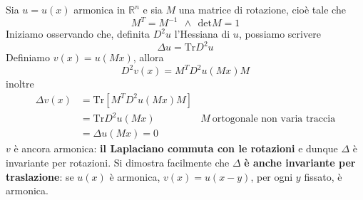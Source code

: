 \documentclass[10pt,a4paper,twoside,openright]{book}
\begin{document}
Sia $\displaystyle u=u(x)$ armonica in $\displaystyle \mathbb{R}^{n}$ e sia $\displaystyle M$ una matrice di rotazione, cioè tale che
\begin{equation*}
	M^{T} =M^{-1} \ \ \land \ \ \mathrm{det} M=1
\end{equation*}
Iniziamo osservando che, definita $\displaystyle D^{2} u$ l'Hessiana di $\displaystyle u$, possiamo scrivere
\begin{equation*}
	\Delta u=\mathrm{Tr} D^{2} u
\end{equation*}
Definiamo $\displaystyle v(x) =u(Mx)$, allora
\begin{equation*}
	D^{2} v(x) =M^{T} D^{2} u(Mx) M
\end{equation*}
inoltre
\begin{align*}
	\Delta v(x) & =\mathrm{Tr}\left[ M^{T} D^{2} u(Mx) M\right] &                                        \\
	             & =\mathrm{Tr} D^{2} u(Mx)                      & M\ \text{ortogonale non varia traccia} \\
	             & =\Delta u(Mx) =0                              &                                        
\end{align*}
$\displaystyle v$ è ancora armonica: \textbf{il Laplaciano commuta con le rotazioni} e dunque $\displaystyle \Delta $ è invariante per rotazioni. Si dimostra facilmente che $\displaystyle \Delta $ \textbf{è anche invariante per traslazione}: se $\displaystyle u(x)$ è armonica, $\displaystyle v(x) =u(x-y)$, per ogni $\displaystyle y$ fissato, è armonica.
\end{document}
